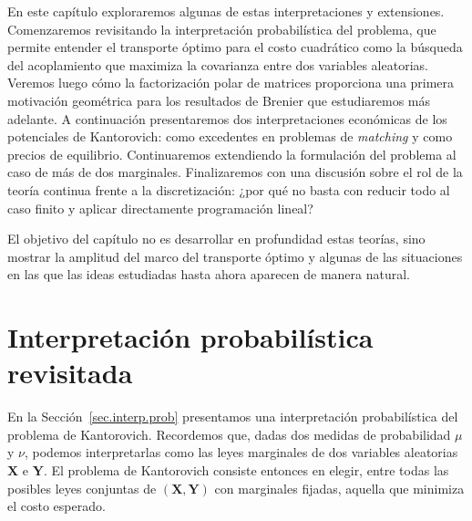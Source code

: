 \documentclass[12pt, a4paper]{amsbook}
\theoremstyle{remark}
\theoremstyle{definition}
\numberwithin{section}{chapter}
\numberwithin{subsection}{section}
\numberwithin{equation}{section}
\numberwithin{figure}{chapter}
\begin{document}
En este capítulo exploraremos algunas de estas interpretaciones y extensiones.
Comenzaremos revisitando la interpretación probabilística del problema,
que permite entender el transporte óptimo para el costo cuadrático como la
búsqueda del acoplamiento que maximiza la covarianza entre dos variables
aleatorias. Veremos luego cómo la factorización polar de matrices proporciona
una primera motivación geométrica para los resultados de Brenier que
estudiaremos más adelante. A continuación presentaremos dos interpretaciones
económicas de los potenciales de Kantorovich: como excedentes en problemas de
\emph{matching} y como precios de equilibrio. Continuaremos extendiendo la
formulación del problema al caso de más de dos marginales. Finalizaremos con
una discusión sobre el rol de la teoría continua frente a la discretización:
¿por qué no basta con reducir todo al caso finito y aplicar directamente
programación lineal?
 
El objetivo del capítulo no es desarrollar en profundidad estas teorías, sino
mostrar la amplitud del marco del transporte óptimo y algunas de las
situaciones en las que las ideas estudiadas hasta ahora aparecen de manera
natural.

\section{Interpretación probabilística revisitada}

En la Sección~\ref{sec.interp.prob} presentamos una interpretación probabilística del problema
de Kantorovich. Recordemos que, dadas dos medidas de probabilidad $\mu$ y
$\nu$, podemos interpretarlas como las leyes marginales de dos variables
aleatorias $\mathbf{X}$ e $\mathbf{Y}$. El problema de Kantorovich consiste
entonces en elegir, entre todas las posibles leyes conjuntas de
$(\mathbf{X},\mathbf{Y})$ con marginales fijadas, aquella que minimiza el
costo esperado.
\end{document}
